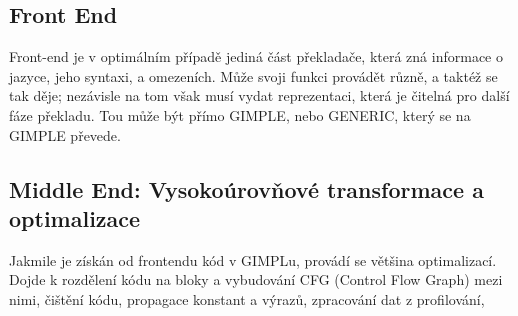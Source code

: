 \subsection{Front End}

Front-end je v optimálním případě jediná část překladače, která zná informace o
jazyce, jeho syntaxi, a omezeních. Může svoji funkci provádět různě, a taktéž se
tak děje; nezávisle na tom však musí vydat reprezentaci, která je čitelná pro
další fáze překladu. Tou může být přímo GIMPLE, nebo GENERIC, který se na GIMPLE
převede.

\subsection{Middle End: Vysokoúrovňové transformace a optimalizace}

Jakmile je získán od frontendu kód v GIMPLu, provádí se většina optimalizací.
Dojde k rozdělení kódu na bloky a vybudování CFG (Control Flow Graph) mezi nimi,
čištění kódu, propagace konstant a výrazů, zpracování dat z profilování,
